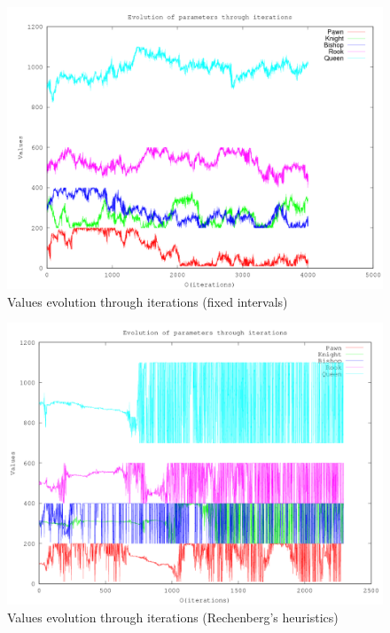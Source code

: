 \documentclass[11pt,a4paper,twocolumn]{article}
\begin{document}
\begin{center}
\begin{figure}
\includegraphics[scale=0.45]{images/history_individuals_3.png}
\caption{Values evolution through iterations (fixed intervals)}
\end{figure}
\end{center}

\begin{center}
\begin{figure}
\includegraphics[scale=0.45]{images/history_individuals_4.png}
\caption{Values evolution through iterations (Rechenberg's heuristics)}
\end{figure}
\end{center}
\end{document}
